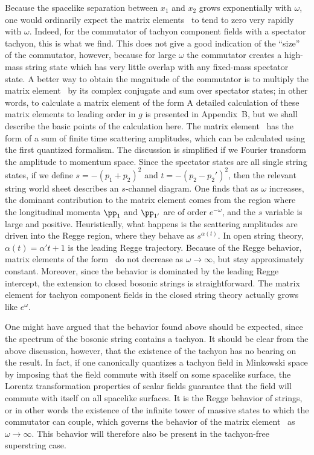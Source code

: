Because the spacelike separation between $x_1$ and $x_2$ grows
exponentially with $\omega$, one would ordinarily expect the matrix
elements \goobthree\ to tend to zero very rapidly with $\omega$.
Indeed, for the commutator of tachyon component fields with a
spectator tachyon, this is what we find.  This does
not give a good indication of the ``size'' of the commutator,
however,
because for large $\omega$ the commutator creates a high-mass string
state which has very little overlap with any fixed-mass spectator
state. A better way to obtain the magnitude
of the commutator is to multiply the matrix element \goobthree\ by
its complex conjugate and sum over spectator states;
in other words, to calculate a matrix element of the form
\eqn{}
A detailed calculation of these matrix elements to leading order in
$g$ is presented in Appendix~B, but we shall describe the basic
points of the calculation here.  The matrix element \goobfour\ has
the form of a sum of finite time scattering amplitudes, which can be
calculated using the first quantized formalism.  The discussion is
simplified if we Fourier transform the amplitude to momentum space.
Since the spectator states are all single string states,
if we define  $s = -(p_1 + p_2)^2$ and $t = -(p_2 - {p_2}')^2$,
then the relevant string world sheet describes an $s$-channel
diagram.
One finds that as $\omega$ increases, the dominant contribution to
the matrix element
comes from the region where the longitudinal momenta $\pp_1$ and
$\pp_{1'}$ are of order $e^{-\omega}$, and the $s$ variable
is large and positive.  Heuristically, what happens is the
scattering amplitudes are driven into the Regge region, where they
behave as $s^{\alpha(t)}$.  In open string theory,
$\alpha(t) =
\alpha' t + 1$ is the leading Regge trajectory.  Because of the Regge
behavior, matrix elements of the form \goobfour\ do
not decrease as $\omega \rightarrow \infty$, but
stay approximately constant.
Moreover, since the
behavior is dominated
by the leading Regge intercept, the extension to closed bosonic
strings is straightforward.  The matrix element
for tachyon component fields in the closed string theory
actually grows like $e^{\omega}$.

One might have argued that the behavior found above should be
expected, since the spectrum of the bosonic string contains a
tachyon.  It should be clear from the above discussion, however, that
the existence of the tachyon has no bearing on the result.  In fact,
if one canonically quantizes a tachyon field in Minkowski space by
imposing that the field commute with itself on some spacelike
surface,
the Lorentz transformation properties of scalar fields guarantee that
the field will commute with itself on all spacelike surfaces.  It is
the
Regge behavior of strings, or in other words the existence of the
infinite tower of massive states to which the commutator can couple,
which governs the behavior of the matrix element \goobfour\ as
$\omega \rightarrow \infty$.  This behavior will therefore also be
present in the tachyon-free superstring case.

